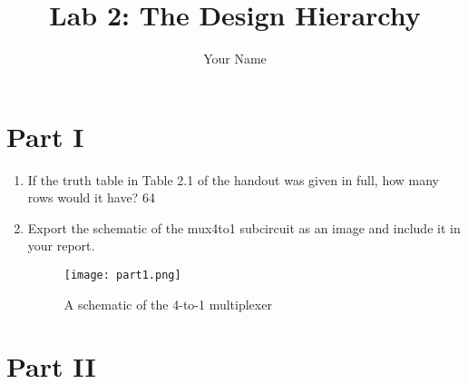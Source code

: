 \documentclass{article}
\title{Lab 2: The Design Hierarchy}
\author{Your Name}
\begin{document}
\maketitle

\section*{Part I}

\begin{enumerate}
\item If the truth table in Table 2.1 of the handout was given in full, how many rows would it have?
64

\item Export the schematic of the mux4to1 subcircuit as an image and include it in your report.

\begin{figure}[ht!]
    \centering
    \texttt{[image: part1.png]}
    \caption{A schematic of the 4-to-1 multiplexer}
    \label{f:part1}
\end{figure}
\end{enumerate}

\section*{Part II}
\end{document}

